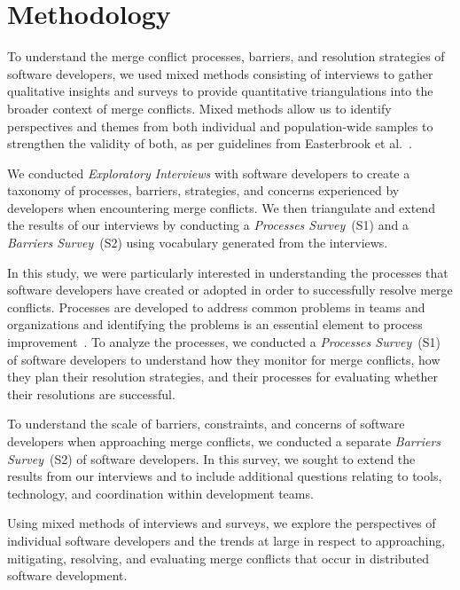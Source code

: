 
\section{Methodology}\label{methodology}


To understand the merge conflict processes, barriers, and resolution strategies of software developers, we used mixed methods consisting of interviews to gather qualitative insights and surveys to provide quantitative triangulations into the broader context of merge conflicts.
Mixed methods allow us to identify perspectives and themes from both individual and population-wide samples to strengthen the validity of both, as per guidelines from Easterbrook et al.~\cite{easterbrook2008selecting}.

We conducted \textit{Exploratory Interviews} with software developers to create a taxonomy of processes, barriers, strategies, and concerns experienced by developers when encountering merge conflicts.
We then triangulate and extend the results of our interviews by conducting a \textit{Processes Survey}~(S1) and a \textit{Barriers Survey}~(S2) using vocabulary generated from the interviews. 

In this study, we were particularly interested in understanding the processes that software developers have created or adopted in order to successfully resolve merge conflicts.
Processes are developed to address common problems in teams and organizations and identifying the problems is an essential element to process improvement~\cite{beecham2003software}.
To analyze the processes, we conducted a \textit{Processes Survey}~(S1) of software developers to understand how they monitor for merge conflicts, how they plan their resolution strategies, and their processes for evaluating whether their resolutions are successful.

To understand the scale of barriers, constraints, and concerns of software developers when approaching merge conflicts, we conducted a separate \textit{Barriers Survey}~(S2) of software developers.
In this survey, we sought to extend the results from our interviews and to include additional questions relating to tools, technology, and coordination within development teams.

Using mixed methods of interviews and surveys, we explore the perspectives of individual software developers and the trends at large in respect to approaching, mitigating, resolving, and evaluating merge conflicts that occur in distributed software development.


